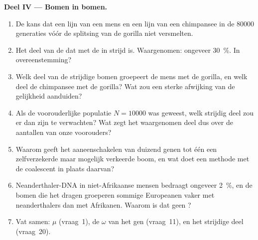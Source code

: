 \begin{problem}
\medskip
\noindent\textbf{Deel IV --- Bomen in bomen.}
\begin{enumerate}[resume]
  \item De kans dat een lijn van een mens en een lijn van een chimpansee
        in de \num{80000} generaties vóór de splitsing van de gorilla
        niet versmelten.
  \item Het deel van de  dat met de  in strijd is.
        Waargenomen: ongeveer \qty{30}{\%}. In overeenstemming?
  \item Welk deel van de strijdige bomen groepeert de mens met de
        gorilla, en welk deel de chimpansee met de gorilla? Wat zou een
        sterke afwijking van de gelijkheid aanduiden?
  \item Als de voorouderlijke populatie $N = \num{10000}$ was geweest,
        welk strijdig deel zou er dan zijn te verwachten? Wat zegt het
        waargenomen deel dus over de aantallen van onze voorouders?
  \item Waarom geeft het aaneenschakelen van duizend genen tot één
         een zelfverzekerde maar mogelijk verkeerde boom, en
        wat doet een methode met de coalescent in plaats daarvan?
  \item Neanderthaler-DNA in niet-Afrikaanse mensen bedraagt ongeveer
        \qty{2}{\%}, en de bomen die het dragen groeperen sommige
        Europeanen vaker met neanderthalers dan met Afrikanen. Waarom is
        dat geen ?
  \item Vat samen: $\mu$ (vraag~1), de $\omega$ van het gen
        (vraag~11), en het strijdige deel (vraag~20).
\end{enumerate}
\end{problem}

